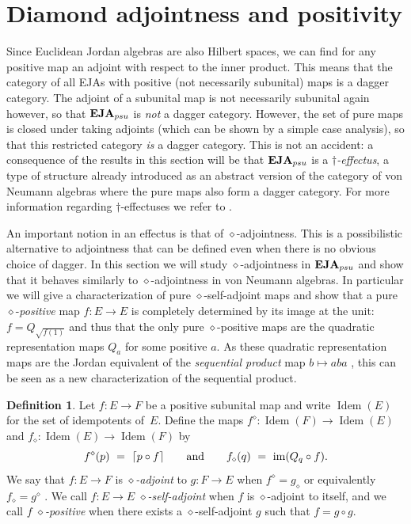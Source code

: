 \documentclass[submission,copyright,creativecommons]{eptcs}
\newcounter{main}
\theoremstyle{definition}
\newtheorem{definition}[main]{Definition}
\DeclarePairedDelimiter{\ceil}{\lceil}{\rceil}
\DeclareMathOperator{\im}{im}
\newcommand{\EJA}{\text{\textbf{EJA}}\xspace}
\DeclareMathOperator{\Idem}{Idem}
\begin{document}
\section{Diamond adjointness and positivity}\label{sec:diamond}
Since Euclidean Jordan algebras are also Hilbert spaces, we can find for any positive map an adjoint with respect to the inner product. This means that the category of all EJAs with positive (not necessarily subunital) maps is a dagger category. The adjoint of a subunital map is not necessarily subunital again however, so that $\EJA_{psu}$ is \emph{not} a dagger category. However, the set of pure maps is closed under taking adjoints (which can be shown by a simple case analysis), so that this restricted category \emph{is} a dagger category. This is not an accident: a consequence of the results in this section will be that $\EJA_{psu}$ is a \emph{$\dagger$-effectus}, a type of structure already introduced as an abstract version of the category of von Neumann algebras where the pure maps also form a dagger category. For more information regarding $\dagger$-effectuses we refer to \cite{basthesis}.

An important notion in an effectus is that of $\diamond$-adjointness. This is a possibilistic alternative to adjointness that can be defined even when there is no obvious choice of dagger. In this section we will study $\diamond$-adjointness in $\EJA_{psu}$ and show that it behaves similarly to $\diamond$-adjointness in von Neumann algebras. In particular we will give a characterization of pure $\diamond$-self-adjoint maps and show that a pure $\diamond$-\emph{positive} map $f:E\rightarrow E$ is completely determined by its image at the unit: $f = Q_{\sqrt{f(1)}}$ and thus that the only pure $\diamond$-positive maps are the quadratic representation maps $Q_a$ for some positive $a$. As these quadratic representation maps are the Jordan equivalent of the \emph{sequential product} map $b\mapsto aba$ \cite{wetering2018characterisation}, this can be seen as a new characterization of the sequential product.

\begin{definition}
Let $f: E\rightarrow F$ be a positive subunital map and write $\Idem(E)$
for the set of idempotents of~$E$. Define
the maps $f^\diamond\colon \Idem(F)\to\Idem(E)$
and $f_\diamond\colon \Idem(E)\to\Idem(F)$
by 
\begin{equation*}
f^\diamond(p)\ =\ \ceil{p\circ f}
	\qquad\text{and}\qquad
f_\diamond(q)\ =\ \im( Q_q\circ f ).
\end{equation*}
We say that $f:E\rightarrow F$ is \emph{$\diamond$-adjoint} to $g:F\rightarrow E$ when $f^\diamond = g_\diamond$ or equivalently $f_\diamond = g^\diamond$ \cite{basthesis}. We call $f:E\rightarrow E$ \emph{$\diamond$-self-adjoint} when $f$ is $\diamond$-adjoint to itself, and we call $f$ \emph{$\diamond$-positive} when there exists a $\diamond$-self-adjoint $g$ such that $f=g\circ g$.
\end{definition}
\end{document}
